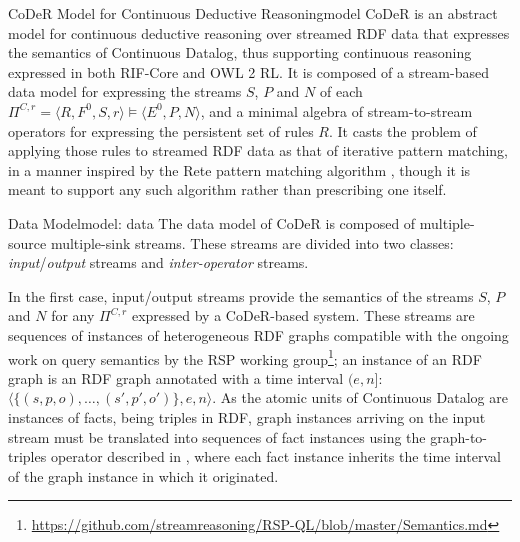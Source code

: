 \begin{nestedsection}{CoDeR Model for Continuous Deductive Reasoning}{model}
	CoDeR is an abstract model for continuous deductive reasoning over streamed RDF data that expresses the semantics of Continuous Datalog, thus supporting continuous reasoning expressed in both RIF-Core and OWL 2 RL.
	It is composed of a stream-based data model for expressing the streams $S$, $P$ and $N$ of each ${\Pi^{C,r} = \langle R,F^0,S,r \rangle \models \langle E^0,P,N \rangle}$, and a minimal algebra of stream-to-stream operators for expressing the persistent set of rules $R$.
	It casts the problem of applying those rules to streamed RDF data as that of iterative pattern matching, in a manner inspired by the Rete pattern matching algorithm \citep{forgy79}, though it is meant to support any such algorithm rather than prescribing one itself.

	\begin{nestedsection}{Data Model}{model: data}
		The data model of CoDeR is composed of multiple-source multiple-sink streams.
		These streams are divided into two classes: \emph{input}/\emph{output} streams and \emph{inter-operator} streams.

		In the first case, input/output streams provide the semantics of the streams $S$, $P$ and $N$ for any $\Pi^{C,r}$ expressed by a CoDeR-based system.
		These streams are sequences of instances of heterogeneous RDF graphs compatible with the ongoing work on query semantics by the RSP working group\footnote{\url{https://github.com/streamreasoning/RSP-QL/blob/master/Semantics.md}};
		an instance of an RDF graph is an RDF graph annotated with a time interval ${(e,n]}$: ${\langle \{(s,p,o),\dots,(s',p',o')\},e,n \rangle}$.
		As the atomic units of Continuous Datalog are instances of facts, being triples in RDF, graph instances arriving on the input stream must be translated into sequences of fact instances using the graph-to-triples operator described in , where each fact instance inherits the time interval of the graph instance in which it originated.


\end{nestedsection}
\end{nestedsection}
